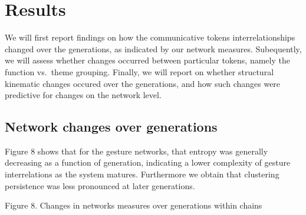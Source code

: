 \documentclass[
  man, noextraspace,floatsintext]{apa6}
\begin{document}
\hypertarget{results}{%
\section{Results}\label{results}}

We will first report findings on how the communicative tokens interrelationships changed over the generations, as indicated by our network measures. Subequently, we will assess whether changes occurred between particular tokens, namely the function vs.~theme grouping. Finally, we will report on whether structural kinematic changes occured over the generations, and how such changes were predictive for changes on the network level.

\hypertarget{network-changes-over-generations}{%
\subsection{Network changes over generations}\label{network-changes-over-generations}}

Figure 8 shows that for the gesture networks, that entropy was generally decreasing as a function of generation, indicating a lower complexity of gesture interrelations as the system matures. Furthermore we obtain that clustering persistence was less pronounced at later generations.

\pagebreak

Figure 8. Changes in networks measures over generations within chains
\end{document}
